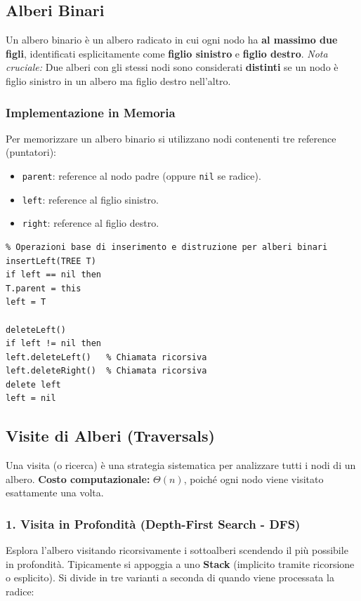 \documentclass[12pt, a4paper]{article}
\begin{document}
\newpage

\subsection{Alberi Binari}
Un albero binario è un albero radicato in cui ogni nodo ha \textbf{al massimo due figli}, identificati esplicitamente come \textbf{figlio sinistro} e \textbf{figlio destro}.
\textit{Nota cruciale:} Due alberi con gli stessi nodi sono considerati \textbf{distinti} se un nodo è figlio sinistro in un albero ma figlio destro nell'altro.

\subsubsection{Implementazione in Memoria}
Per memorizzare un albero binario si utilizzano nodi contenenti tre reference (puntatori):
\begin{itemize}
\item \texttt{parent}: reference al nodo padre (oppure \texttt{nil} se radice).
\item \texttt{left}: reference al figlio sinistro.
\item \texttt{right}: reference al figlio destro.
\end{itemize}

\begin{verbatim}
% Operazioni base di inserimento e distruzione per alberi binari
insertLeft(TREE T)
if left == nil then
T.parent = this
left = T

deleteLeft()
if left != nil then
left.deleteLeft()   % Chiamata ricorsiva
left.deleteRight()  % Chiamata ricorsiva
delete left
left = nil
\end{verbatim}

\subsection{Visite di Alberi (Traversals)}
Una visita (o ricerca) è una strategia sistematica per analizzare tutti i nodi di un albero.
\textbf{Costo computazionale:} $\Theta(n)$, poiché ogni nodo viene visitato esattamente una volta.

\subsubsection{1. Visita in Profondità (Depth-First Search - DFS)}
Esplora l'albero visitando ricorsivamente i sottoalberi scendendo il più possibile in profondità. Tipicamente si appoggia a uno \textbf{Stack} (implicito tramite ricorsione o esplicito). Si divide in tre varianti a seconda di quando viene processata la radice:
\end{document}
